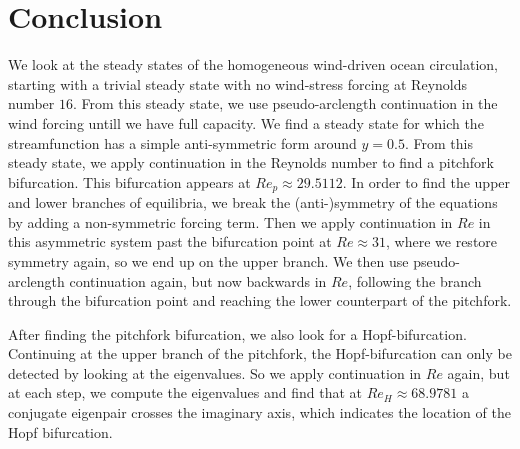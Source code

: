 \section{Conclusion}
We look at the steady states of the homogeneous wind-driven ocean circulation, starting with a trivial steady state with no wind-stress forcing at Reynolds number $16$. From this steady state, we use pseudo-arclength continuation in the wind forcing untill we have full capacity. We find a steady state for which the streamfunction has a simple anti-symmetric form around $y = 0.5$. From this steady state, we apply continuation in the Reynolds number to find a pitchfork bifurcation. This bifurcation appears at $Re_p \approx 29.5112$. In order to find the upper and lower branches of equilibria, we break the (anti-)symmetry of the equations by adding a non-symmetric forcing term. Then we apply continuation in $Re$ in this asymmetric system past the bifurcation point at $Re\approx 31$, where we restore symmetry again, so we end up on the upper branch. We then use pseudo-arclength continuation again, but now backwards in $Re$, following the branch through the bifurcation point and reaching the lower counterpart of the pitchfork.

After finding the pitchfork bifurcation, we also look for a Hopf-bifurcation. Continuing at the upper branch of the pitchfork, the Hopf-bifurcation can only be detected by looking at the eigenvalues. So we apply continuation in $Re$ again, but at each step, we compute the eigenvalues and find that at $Re_H \approx 68.9781$ a conjugate eigenpair crosses the imaginary axis, which indicates the location of the Hopf bifurcation.